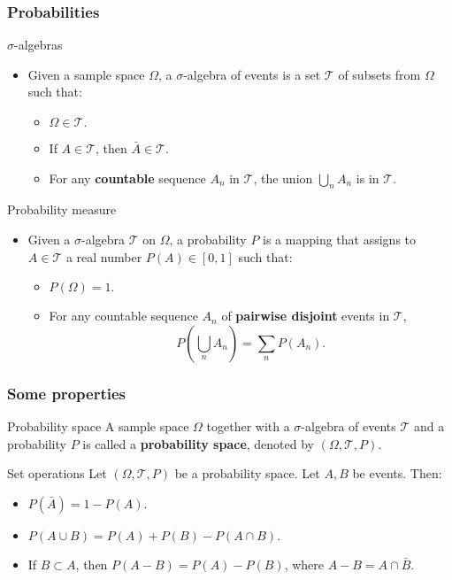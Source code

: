 \documentclass[main.tex]{subfiles}
\begin{document}
\begin{frame}
    \frametitle{Probabilities}
    \begin{block}{$\sigma$-algebras}
        \begin{itemize}
            \item<+-> Given a sample space $\Omega$, a $\sigma$-algebra of
            events is a set $\mathcal{T}$ of subsets from $\Omega$ such that:
            \begin{itemize}
                \item<+-> $\Omega \in \mathcal{T}.$
                \item<+-> If $A \in \mathcal{T}$, then $\bar{A} \in \mathcal{T}.$
                \item<+-> For any \textbf{countable} sequence $A_n$ in $\mathcal{T}$, the union
                $\bigcup_n A_n$ is in $\mathcal{T}.$
            \end{itemize}
        \end{itemize}
    \end{block}
\begin{block}{Probability measure}
    \begin{itemize}
        \item<+-> Given a $\sigma$-algebra $\mathcal{T}$ on $\Omega$, a 
        probability $P$ is a mapping that assigns to $A \in \mathcal{T}$ a real
        number $P(A) \in [0,1]$ such that:
        \begin{itemize}
        \item<+-> $P\left( \Omega \right) = 1.$
        \item<+-> For any countable sequence $A_n$ of \textbf{pairwise disjoint} events in $\mathcal{T}$,
        \begin{equation}
             \label{eq:proba_additivty}
            P\left( \bigcup_n A_n \right) = \sum_n P\left( A_n \right).
        \end{equation}
        \end{itemize}
    \end{itemize}
\end{block}
\end{frame}
\begin{frame}
    \frametitle{Some properties}
\begin{block}{Probability space}
A sample space $\Omega$ together with a $\sigma$-algebra of events $\mathcal{T}$ and
a probability $P$ is called a \textbf{probability space}, denoted by 
$\left( \Omega, \mathcal{T}, P \right).$
\end{block}
\begin{block}{Set operations}
    Let $\left( \Omega, \mathcal{T}, P \right)$ be a probability space. 
    Let $A,B$ be events. Then:
    \begin{itemize}
        \item<+-> $P\left(\bar{A} \right) = 1 - P(A).$
        \item<+-> $P\left( A \cup B \right) = P(A) + P(B) - P\left( A \cap B \right).$
        \item<+-> If $B \subset A$, then $P\left( A - B \right) = P(A) - P(B)$, where
        $A-B = A \cap \bar{B}.$
    \end{itemize}
\end{block}
\end{frame}
\end{document}
